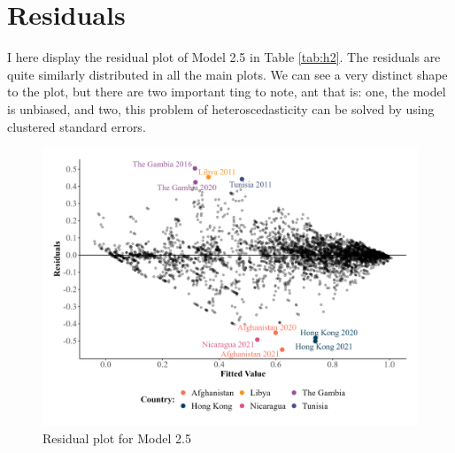 \newpage

\section{Residuals}
I here display the residual plot of Model 2.5 in Table \ref{tab:h2}. The residuals are quite similarly distributed in all the main plots. We can see a very distinct shape to the plot, but there are two important ting to note, ant that is: one, the model is unbiased, and two, this problem of heteroscedasticity can be solved by using clustered standard errors.

\begin{figure}[H]
    \centering
    \includegraphics[width=\linewidth]{graphics/residuals.jpeg}
    \caption{Residual plot for Model 2.5}
    \label{fig:residuals}
\end{figure}